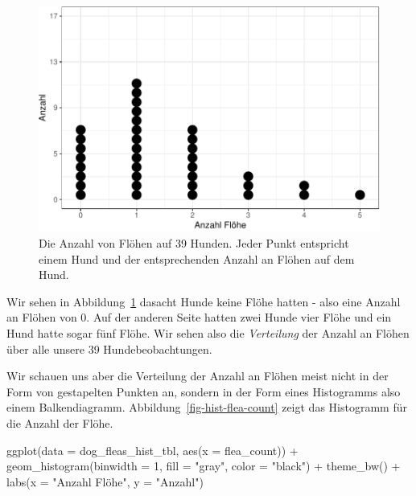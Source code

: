\documentclass[
  letterpaper,
  DIV=11,
  oneside]{scrreport}
\newenvironment{Shaded}{\begin{snugshade}}{\end{snugshade}}
\newcommand{\AttributeTok}[1]{\textcolor[rgb]{0.40,0.45,0.13}{#1}}
\newcommand{\DecValTok}[1]{\textcolor[rgb]{0.68,0.00,0.00}{#1}}
\newcommand{\FunctionTok}[1]{\textcolor[rgb]{0.28,0.35,0.67}{#1}}
\newcommand{\NormalTok}[1]{\textcolor[rgb]{0.00,0.23,0.31}{#1}}
\newcommand{\SpecialCharTok}[1]{\textcolor[rgb]{0.37,0.37,0.37}{#1}}
\newcommand{\StringTok}[1]{\textcolor[rgb]{0.13,0.47,0.30}{#1}}
\begin{document}
\begin{figure}

{\centering \includegraphics{./eda-ggplot_files/figure-pdf/fig-dotplot-flea-1-1.pdf}

}

\caption{\label{fig-dotplot-flea-1}Die Anzahl von Flöhen auf 39 Hunden.
Jeder Punkt entspricht einem Hund und der entsprechenden Anzahl an
Flöhen auf dem Hund.}

\end{figure}

Wir sehen in Abbildung~\ref{fig-dotplot-flea-1} dasacht Hunde keine
Flöhe hatten - also eine Anzahl an Flöhen von 0. Auf der anderen Seite
hatten zwei Hunde vier Flöhe und ein Hund hatte sogar fünf Flöhe. Wir
sehen also die \emph{Verteilung} der Anzahl an Flöhen über alle unsere
39 Hundebeobachtungen.

Wir schauen uns aber die Verteilung der Anzahl an Flöhen meist nicht in
der Form von gestapelten Punkten an, sondern in der Form eines
Histogramms also einem Balkendiagramm.
Abbildung~\ref{fig-hist-flea-count} zeigt das Histogramm für die Anzahl
der Flöhe.

\begin{Shaded}
\begin{Highlighting}[]
\FunctionTok{ggplot}\NormalTok{(}\AttributeTok{data =}\NormalTok{ dog\_fleas\_hist\_tbl, }\FunctionTok{aes}\NormalTok{(}\AttributeTok{x =}\NormalTok{ flea\_count)) }\SpecialCharTok{+}
  \FunctionTok{geom\_histogram}\NormalTok{(}\AttributeTok{binwidth =} \DecValTok{1}\NormalTok{, }\AttributeTok{fill =} \StringTok{"gray"}\NormalTok{, }\AttributeTok{color =} \StringTok{"black"}\NormalTok{) }\SpecialCharTok{+}
  \FunctionTok{theme\_bw}\NormalTok{() }\SpecialCharTok{+}
  \FunctionTok{labs}\NormalTok{(}\AttributeTok{x =} \StringTok{"Anzahl Flöhe"}\NormalTok{, }\AttributeTok{y =} \StringTok{"Anzahl"}\NormalTok{) }
\end{Highlighting}
\end{Shaded}
\end{document}
